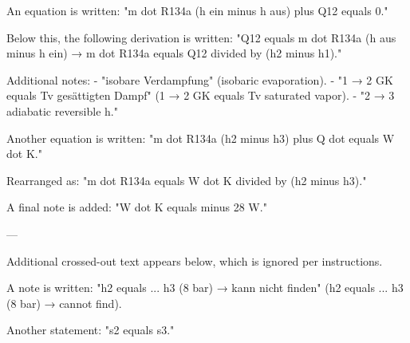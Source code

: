 An equation is written:  
"m dot R134a (h ein minus h aus) plus Q12 equals 0."  

Below this, the following derivation is written:  
"Q12 equals m dot R134a (h aus minus h ein) → m dot R134a equals Q12 divided by (h2 minus h1)."  

Additional notes:  
- "isobare Verdampfung" (isobaric evaporation).  
- "1 → 2 GK equals Tv gesättigten Dampf" (1 → 2 GK equals Tv saturated vapor).  
- "2 → 3 adiabatic reversible h."  

Another equation is written:  
"m dot R134a (h2 minus h3) plus Q dot equals W dot K."  

Rearranged as:  
"m dot R134a equals W dot K divided by (h2 minus h3)."  

A final note is added:  
"W dot K equals minus 28 W."  

---

Additional crossed-out text appears below, which is ignored per instructions.  

A note is written:  
"h2 equals ... h3 (8 bar) → kann nicht finden" (h2 equals ... h3 (8 bar) → cannot find).  

Another statement:  
"s2 equals s3."